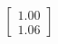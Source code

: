\documentclass[preview]{standalone}
\begin{document}
\begin{align*}
\begin{bmatrix} 1.00 \\ 1.06 \end{bmatrix}
\end{align*}
\end{document}
